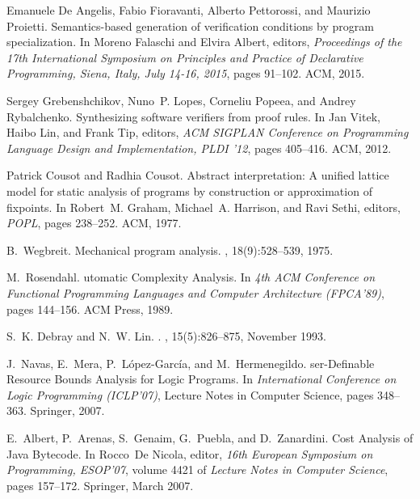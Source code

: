 \documentclass[oneside]{book}
\begin{document}
\begin{thebibliography}{10}
Emanuele {De Angelis}, Fabio Fioravanti, Alberto Pettorossi, and Maurizio
  Proietti.
\newblock Semantics-based generation of verification conditions by program
  specialization.
\newblock In Moreno Falaschi and Elvira Albert, editors, {\em Proceedings of
  the 17th International Symposium on Principles and Practice of Declarative
  Programming, Siena, Italy, July 14-16, 2015}, pages 91--102. {ACM}, 2015.

Sergey Grebenshchikov, Nuno~P. Lopes, Corneliu Popeea, and Andrey Rybalchenko.
\newblock Synthesizing software verifiers from proof rules.
\newblock In Jan Vitek, Haibo Lin, and Frank Tip, editors, {\em ACM SIGPLAN
  Conference on Programming Language Design and Implementation, PLDI '12},
  pages 405--416. ACM, 2012.

Patrick Cousot and Radhia Cousot.
\newblock Abstract interpretation: A unified lattice model for static analysis
  of programs by construction or approximation of fixpoints.
\newblock In Robert~M. Graham, Michael~A. Harrison, and Ravi Sethi, editors,
  {\em POPL}, pages 238--252. ACM, 1977.

B.~Wegbreit.
\newblock Mechanical program analysis.
, 18(9):528--539, 1975.

M.~Rosendahl.
utomatic {C}omplexity {A}nalysis.
\newblock In {\em 4th ACM {C}onference on {F}unctional {P}rogramming
  {L}anguages and {C}omputer {A}rchitecture (FPCA'89)}, pages 144--156. ACM
  Press, 1989.

S.~K. Debray and N.~W. Lin.
.
,
  15(5):826--875, November 1993.

J.~Navas, E.~Mera, P.~L\'{o}pez-Garc\'{i}a, and M.~Hermenegildo.
ser-{D}efinable {R}esource {B}ounds {A}nalysis for {L}ogic
  {P}rograms.
\newblock In {\em International Conference on Logic Programming (ICLP'07)},
  Lecture Notes in Computer Science, pages 348--363. Springer, 2007.

E.~Albert, P.~Arenas, S.~Genaim, G.~Puebla, and D.~Zanardini.
\newblock Cost {A}nalysis of {J}ava {B}ytecode.
\newblock In Rocco~De Nicola, editor, {\em 16th European Symposium on
  Programming, ESOP'07}, volume 4421 of {\em Lecture Notes in Computer
  Science}, pages 157--172. Springer, March 2007.


\end{thebibliography}
\end{document}

